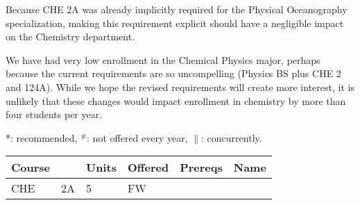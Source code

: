\documentclass[12pt]{article}
\begin{document}
Because CHE 2A was already implicitly required for the Physical
Oceanography specialization, making this requirement explicit should
have a negligible impact on the Chemistry department.

We have had very low enrollment in the Chemical Physics major, perhaps
because the current requirements are so uncompelling (Physics BS plus
CHE 2 and 124A).  While we hope the revised requirements will create
more interest, it is unlikely that these changes would impact
enrollment in chemistry by more than four students per year.

\newpage
{}
\vskip 0.25cm
\noindent
*: recommended, $^\#$: not offered every year, $\parallel$: concurrently.\\
\begin{tabular}{|llllll|}
\hline
Course & & Units & Offered & Prereqs & Name \\
\hline
CHE  & 2A     & 5 & FW  & & \\
\hline
\end{tabular}\\
\end{document}
